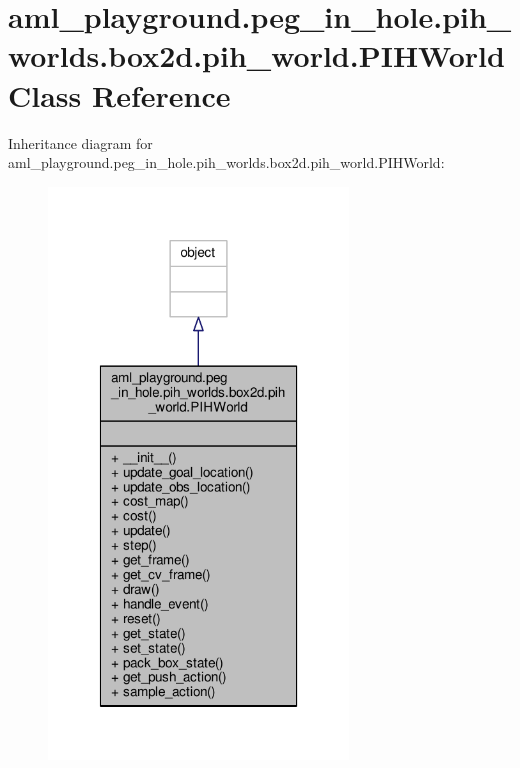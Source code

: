\hypertarget{classaml__playground_1_1peg__in__hole_1_1pih__worlds_1_1box2d_1_1pih__world_1_1_p_i_h_world}{\section{aml\-\_\-playground.\-peg\-\_\-in\-\_\-hole.\-pih\-\_\-worlds.\-box2d.\-pih\-\_\-world.\-P\-I\-H\-World Class Reference}
\label{classaml__playground_1_1peg__in__hole_1_1pih__worlds_1_1box2d_1_1pih__world_1_1_p_i_h_world}
}


Inheritance diagram for aml\-\_\-playground.\-peg\-\_\-in\-\_\-hole.\-pih\-\_\-worlds.\-box2d.\-pih\-\_\-world.\-P\-I\-H\-World\-:
\nopagebreak
\begin{figure}[H]
\begin{center}
\leavevmode
\includegraphics[width=226pt]{classaml__playground_1_1peg__in__hole_1_1pih__worlds_1_1box2d_1_1pih__world_1_1_p_i_h_world__inherit__graph}
\end{center}
\end{figure}


